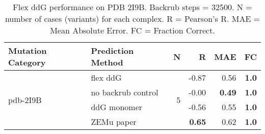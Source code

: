 \begin{table}
  \begin{tabular}{llrrrr}
\toprule
Mutation Category &   Prediction Method &  N &     R &  MAE &  FC \\
\midrule
 \multirow{ 4}{*}{pdb-2I9B} & flex ddG & \multirow{ 4}{*}{5} & -0.87 & 0.56 & \textbf{1.0}  \\
 & no backrub control & & -0.00 & \textbf{0.49} & \textbf{1.0}  \\
 & ddG monomer & & -0.56 & 0.55 & \textbf{1.0}  \\
 & ZEMu paper & & \textbf{0.65} & 0.62 & \textbf{1.0}  \\
\bottomrule
\end{tabular}
  \caption[Flex ddG performance on PDB 2I9B]{
    Flex ddG performance on PDB 2I9B. Backrub steps = 32500. N = number of cases (variants) for each complex. R = Pearson's R. MAE = Mean Absolute Error. FC = Fraction Correct.
  } \label{tab:table-pdb-2I9B}
\end{table}

